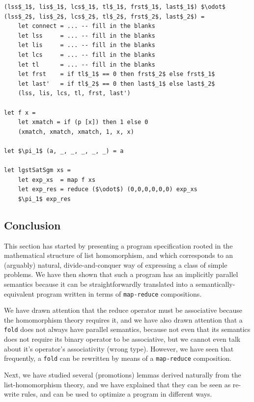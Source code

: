 \documentclass[acmsmall,review]{acmart}\settopmatter{printfolios=true,printccs=false,printacmref=false}
\begin{document}
\begin{lstlisting}[mathescape=true]
(lss$_1$, lis$_1$, lcs$_1$, tl$_1$, frst$_1$, last$_1$) $\odot$
(lss$_2$, lis$_2$, lcs$_2$, tl$_2$, frst$_2$, last$_2$) =
    let connect = ... -- fill in the blanks
    let lss     = ... -- fill in the blanks
    let lis     = ... -- fill in the blanks
    let lcs     = ... -- fill in the blanks
    let tl      = ... -- fill in the blanks
    let frst    = if tl$_1$ == 0 then frst$_2$ else frst$_1$
    let last'   = if tl$_2$ == 0 then last$_1$ else last$_2$
    (lss, lis, lcs, tl, frst, last')

let f x = 
    let xmatch = if (p [x]) then 1 else 0    
    (xmatch, xmatch, xmatch, 1, x, x)

let $\pi_1$ (a, _, _, _, _, _) = a

let lgstSatSgm xs = 
    let exp_xs  = map f xs
    let exp_res = reduce ($\odot$) (0,0,0,0,0,0) exp_xs
    $\pi_1$ exp_res 
\end{lstlisting}\vspace{-2ex}

\subsection{Conclusion}

This section has started by presenting a program specification rooted in
the mathematical structure of list homomorphism, and which corresponds to
an (arguably) natural, divide-and-conquer way of expressing a class of
simple problems.   We have then shown that such a program has an implicitly
parallel semantics because it can be straightforwardly translated into a
semantically-equivalent program written in terms of \lstinline{map-reduce} 
compositions.   

We have drawn attention that the reduce operator must be
associative because the homomorphism theory requires it, and we have
also drawn attention that a {\tt fold} does not always have parallel 
semantics, because not even that its semantics does not require 
its binary operator to be associative, but we cannot even talk about 
it's operator's associativity (wrong type). However, we have seen
that frequently, a {\tt fold} can be rewritten by means of a 
\lstinline{map-reduce} composition. 

Next, we have studied several (promotions) lemmas derived naturally
from the list-homomorphism theory, and we have explained that they can
be seen as re-write rules, and can be used to optimize a program in 
different ways.
\end{document}
